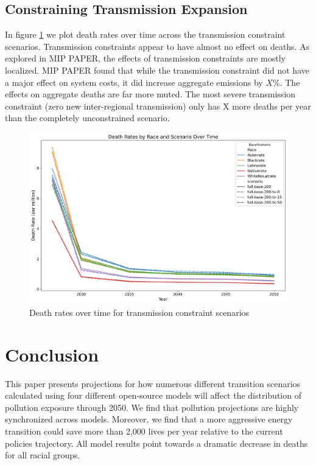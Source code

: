 \documentclass[a4paper]{article}
\theoremstyle{definition}
\theoremstyle{plain}
\begin{document}
\subsection{Constraining Transmission Expansion}
In figure \ref{TransmissionConstraint} we plot death rates over time across the transmission constraint scenarios. Transmission constraints appear to have almost no effect on deaths.  As explored in MIP PAPER, the effects of transmission constraints are mostly localized.  MIP PAPER found that while the transmission constraint did not have a major effect on system costs, it did increase aggregate emissions by $X\%$.  The effects on aggregate deaths are far more muted.  The most severe transmission constraint (zero new inter-regional transmission) only has X more deaths per year than the completely unconstrained scenario.
\begin{figure}
    \centering
    \includegraphics[width=1\linewidth]{Figures/Output/Compare_scenarios_transmissions-constraint_GenX.jpg}
    \caption{Death rates over time for transmission constraint scenarios}
    \label{TransmissionConstraint}
\end{figure}

\section{Conclusion}
This paper presents projections for how numerous different transition scenarios calculated using four different open-source models will affect the distribution of pollution exposure through 2050.  We find that pollution projections are highly synchronized across models.  Moreover, we find that a more aggressive energy transition could save more than 2,000 lives per year relative to the current policies trajectory.  All model results point towards a dramatic decrease in deaths for all racial groups.

\begin{singlespace}
\newpage

%

\end{singlespace}
\end{document}
